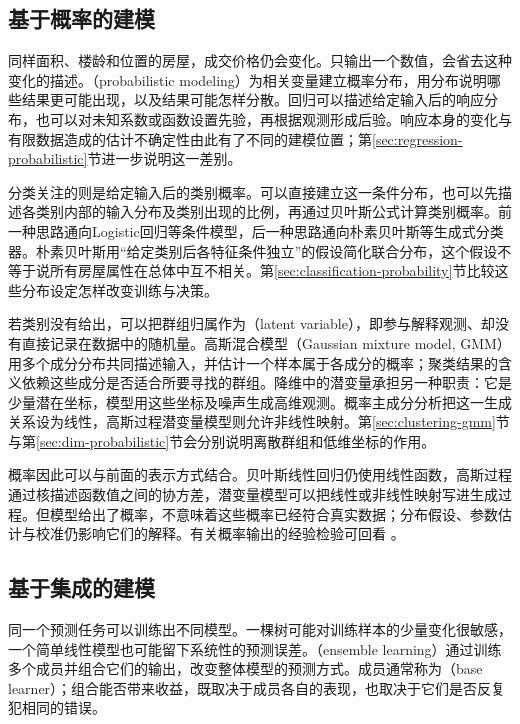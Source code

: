\subsection{基于概率的建模}
\label{sec:classic-overview-probabilistic}

同样面积、楼龄和位置的房屋，成交价格仍会变化。只输出一个数值，会省去这种变化的描述。（probabilistic modeling）为相关变量建立概率分布，用分布说明哪些结果更可能出现，以及结果可能怎样分散。回归可以描述给定输入后的响应分布，也可以对未知系数或函数设置先验，再根据观测形成后验。响应本身的变化与有限数据造成的估计不确定性由此有了不同的建模位置；第\ref{sec:regression-probabilistic}节进一步说明这一差别。

分类关注的则是给定输入后的类别概率。可以直接建立这一条件分布，也可以先描述各类别内部的输入分布及类别出现的比例，再通过贝叶斯公式计算类别概率。前一种思路通向Logistic回归等条件模型，后一种思路通向朴素贝叶斯等生成式分类器。朴素贝叶斯用“给定类别后各特征条件独立”的假设简化联合分布，这个假设不等于说所有房屋属性在总体中互不相关。第\ref{sec:classification-probability}节比较这些分布设定怎样改变训练与决策。

若类别没有给出，可以把群组归属作为（latent variable），即参与解释观测、却没有直接记录在数据中的随机量。高斯混合模型（Gaussian mixture model, GMM）用多个成分分布共同描述输入，并估计一个样本属于各成分的概率；聚类结果的含义依赖这些成分是否适合所要寻找的群组。降维中的潜变量承担另一种职责：它是少量潜在坐标，模型用这些坐标及噪声生成高维观测。概率主成分分析把这一生成关系设为线性，高斯过程潜变量模型则允许非线性映射。第\ref{sec:clustering-gmm}节与第\ref{sec:dim-probabilistic}节会分别说明离散群组和低维坐标的作用。

概率因此可以与前面的表示方式结合。贝叶斯线性回归仍使用线性函数，高斯过程通过核描述函数值之间的协方差，潜变量模型可以把线性或非线性映射写进生成过程。但模型给出了概率，不意味着这些概率已经符合真实数据；分布假设、参数估计与校准仍影响它们的解释。有关概率输出的经验检验可回看
。

\subsection{基于集成的建模}
\label{sec:classic-overview-ensemble}

同一个预测任务可以训练出不同模型。一棵树可能对训练样本的少量变化很敏感，一个简单线性模型也可能留下系统性的预测误差。（ensemble learning）通过训练多个成员并组合它们的输出，改变整体模型的预测方式。成员通常称为（base learner）；组合能否带来收益，既取决于成员各自的表现，也取决于它们是否反复犯相同的错误。

